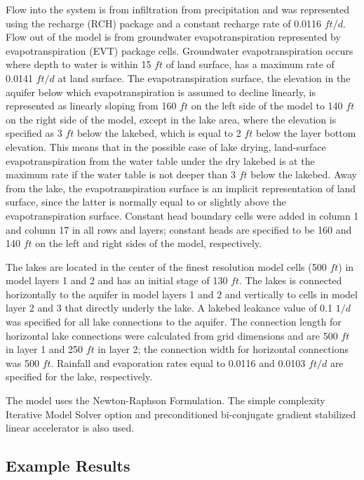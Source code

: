 Flow into the system is from infiltration from precipitation and was represented using the recharge (RCH) package and a constant recharge rate of 0.0116 $ft/d$. Flow out of the model is from groundwater evapotranspiration represented by evapotranspiration (EVT) package cells. Groundwater evapotranspiration occurs where depth to water is within 15 $ft$ of land surface, has a maximum rate of 0.0141 $ft/d$ at land surface. The evapotranspiration surface, the elevation in the aquifer below which evapotranspiration is assumed to decline linearly, is represented as linearly sloping from 160 $ft$ on the left side of the model to 140 $ft$ on the right side of the model, except in the lake area, where the elevation is specified as 3 $ft$ below the lakebed, which is equal to 2 $ft$ below the layer bottom elevation. This means that in the possible case of lake drying, land-surface evapotranspiration from the water table under the dry lakebed is at the maximum rate if the water table is not deeper than 3 $ft$ below the lakebed. Away from the lake, the evapotranspiration surface is an implicit representation of land surface, since the latter is normally equal to or slightly above the evapotranspiration surface. Constant head boundary cells were added in column 1 and column 17 in all rows and layers; constant heads are specified to be 160 and 140 $ft$ on the left and right sides of the model, respectively.

The lakes are located in the center of the finest resolution model cells (500 $ft$) in model layers 1 and 2 and has an initial stage of 130 $ft$. The lakes is connected horizontally to the aquifer in model layers 1 and 2 and vertically to cells in model layer 2 and 3 that directly underly the lake. A lakebed leakance value of 0.1 $1/d$ was specified for all lake connections to the aquifer. The connection length for horizontal lake connections were calculated from grid dimensions and are 500 $ft$ in layer 1 and 250 $ft$ in layer 2; the connection width for horizontal connections was 500 $ft$. Rainfall and evaporation rates equal to 0.0116 and 0.0103 $ft/d$ are specified for the lake, respectively.



The model uses the Newton-Raphson Formulation. The simple complexity Iterative Model Solver option and preconditioned bi-conjugate gradient stabilized linear accelerator is also used.

\subsection{Example Results}

